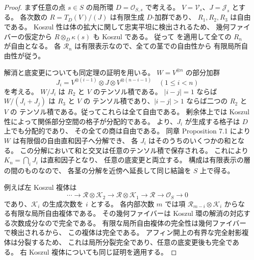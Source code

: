 \begin{proof}
まず任意の点 $s\in S$ の局所環 $D=\mathcal O_{S,s}$ で考える。
$V=\mathcal V_s$、$J=\mathcal J_s$ とする。
各次数の $R=T_D(V)/(J)$ は有限生成 $D$-加群であり、
$R_1,R_2,R_3$ は自由である。
Koszul 性は体の拡大に関して忠実平坦に検出されるため、
幾何ファイバーの仮定から $R\otimes_D\kappa(s)$ も Koszul である。
従って
\cite[Chapter 6, Theorem 7.3]{PolishchukPositselski2005}
を適用して全ての $R_n$ が自由となる。
各 $\mathcal R_n$ は有限表示なので、全ての茎での自由性から
有限局所自由性が従う。

解消と底変更についても同定理の証明を用いる。
$W=V^{\otimes n}$ の部分加群
\[
 J_i=V^{\otimes(i-1)}\otimes J
       \otimes V^{\otimes(n-i-1)}\quad(1\le i<n)
\]
を考える。
$W/J_i$ は $R_2$ と $V$ のテンソル積である。
$|i-j|=1$ ならば $W/(J_i+J_j)$ は $R_3$ と $V$ の
テンソル積であり、$|i-j|>1$ ならば二つの $R_2$ と $V$ の
テンソル積である。従ってこれらは全て自由である。
剰余体上では Koszul 性によって関係部分空間の格子が分配的である。
\cite[Chapter 6, Proposition 7.2]{PolishchukPositselski2005}
より、$J_i$ が生成する格子は $D$ 上でも分配的であり、
その全ての商は自由である。
同章 Proposition 7.1 により $W$ は有限個の自由直和因子へ分解でき、
各 $J_i$ はそのうちのいくつかの和となる。
この分解において和と交叉は任意のテンソル積で保存される。
これにより $K_n=\bigcap_iJ_i$ は直和因子となり、
任意の底変更と両立する。
構成は有限表示の層の間のものなので、
各茎の分解を近傍へ延長して同じ結論を $S$ 上で得る。

例えば左 Koszul 複体は
\[
 \cdots\longrightarrow
 \mathcal R\otimes\mathcal K_2
 \longrightarrow \mathcal R\otimes\mathcal K_1
 \longrightarrow\mathcal R\longrightarrow\mathcal O_S
 \longrightarrow0
\]
であり、$\mathcal K_i$ の生成次数を $i$ とする。
各内部次数 $m$ では項
$\mathcal R_{m-i}\otimes\mathcal K_i$ からなる有限な局所自由複体である。
その幾何ファイバーは Koszul 環の解消の対応する次数成分なので完全である。
有限な局所自由複体の完全性は幾何ファイバーで検出されるから、
この複体は完全である。
アフィン開上の有界な完全射影複体は分裂するため、
これは局所分裂完全であり、任意の底変更後も完全である。
右 Koszul 複体についても同じ証明を適用する。
\end{proof}


